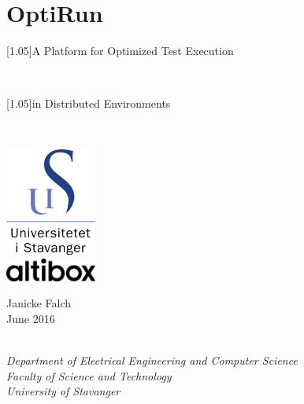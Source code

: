 \vspace*{-1cm}
\section*{\hfill OptiRun \hfill}
\thispagestyle{empty}

\begin{center}
    \scshape{
        \vspace{-1cm}
        \begin{Large}\scalebox{1}[1.05]{A Platform for Optimized Test Execution}\end{Large}\\
        \vspace{0.2cm}
        \begin{Large}\scalebox{1}[1.05]{in Distributed Environments}\end{Large}\\
    }
    \vspace{2cm}
    \includegraphics[width=3cm]{figures/uis_logo}\\
    \vspace{0.8cm}
    \includegraphics[width=3cm]{figures/logo_pos_RGB}\\
    \vspace{2cm}
    \begin{large}Janicke Falch\\
    \vspace{0.2cm}
    June 2016\end{large}\\
    \vspace{1.6cm}
    \emph{
        Department of Electrical Engineering and Computer Science\\
        Faculty of Science and Technology\\
        University of Stavanger
    }
\end{center}